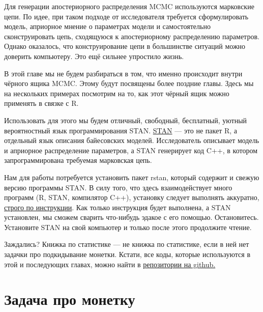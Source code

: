 \documentclass[12pt, a4paper, oneside]{extreport}
\theoremstyle{plain}              %
\theoremstyle{definition}         %
\begin{document}
  Для генерации апостериорного распределения MCMC используются марковские цепи. По идее, при таком подходе от исследователя требуется сформулировать модель, априорное мнение о параметрах модели и самостоятельно сконструировать цепь, сходящуюся к апостериорному распределению параметров. Однако оказалось, что конструирование цепи в большинстве ситуаций можно доверить компьютеру. Это ещё сильнее упростило жизнь.
 
 В этой главе мы не будем разбираться в том, что именно происходит внутри чёрного ящика MCMC. Этому будут посвящены более поздние главы. Здесь мы на нескольких примерах посмотрим на то, как этот чёрный ящик можно применять в связке с R.
 
 Использовать для этого мы будем отличный, свободный, бесплатный, уютный вероятностный язык программирования STAN.  \href{http://mc-stan.org}{STAN} --- это не пакет R, а отдельный язык описания байесовских моделей. Исследователь описывает модель и априорное распределение параметров, а STAN генерирует код C++, в котором запрограммирована требуемая марковская цепь. %
 
 Нам для работы потребуется установить пакет rstan, который содержит и свежую версию программы STAN. В силу того, что здесь взаимодействует много программ (R, STAN, компилятор C++), установку следует выполнять аккуратно,  \href{http://bdemeshev.github.io/em301/r_stan_installation/r_stan_installation.html}{строго по инструкции}.   Как только инструкция будет выполнена, а STAN установлен, мы сможем сварить что-нибудь эдакое с его помощью.  Остановитесь. Установите STAN на свой компьютер и только после этого продолжите чтение. 
 
 Заждались? Книжка по статистике --- не книжка по статистике, если в ней нет задачки про подкидывание монетки.  Кстати,  все коды, которые используются в этой и последующих главах, можно найти в \href{https://github.com/FUlyankin/bayes_book/tree/master/itog_scripts}{репозитории на github.}
 
 \section{Задача про монетку}
 
\end{document}
